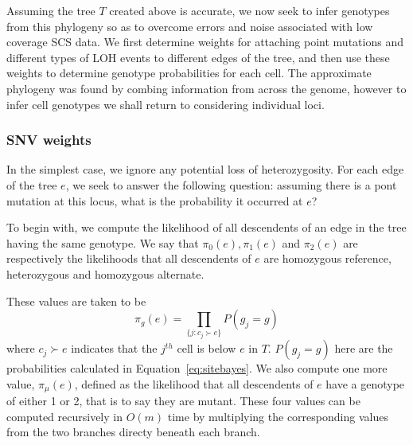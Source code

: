 \documentclass[../../main.tex]{subfiles}
\begin{document}

Assuming the tree $T$ created above is accurate, we now seek to infer genotypes from this phylogeny so as to overcome errors and noise associated with low coverage SCS data.
We first determine weights for attaching point mutations and different types of LOH events to different edges of the tree, and then use these weights to determine genotype probabilities for each cell.
The approximate phylogeny was found by combing information from across the genome, however to infer cell genotypes we shall return to considering individual loci.

\subsubsection*{SNV weights}
In the simplest case, we ignore any potential loss of heterozygosity.
For each edge of the tree $e$, we seek to answer the following question: assuming there is a pont mutation at this locus, what is the probability it occurred at $e$?

To begin with, we compute the likelihood of all descendents of an edge in the tree having the same genotype.
We say that $\pi_0(e), \pi_1(e)$ and $\pi_2(e)$ are respectively the likelihoods that all descendents of $e$ are homozygous reference, heterozygous and homozygous alternate.

These values are taken to be
\begin{equation}
\pi_g(e) = \prod_{\{j:c_j\succ e\}} P(g_j = g)
\end{equation}
where $c_j\succ e$ indicates that the $j^{th}$ cell is below $e$ in $T$.
$P(g_j = g)$ here are the probabilities calculated in Equation~\eqref{eq:sitebayes}.
We also compute one more value, $\pi_\mu(e)$, defined as the likelihood that all descendents of $e$ have a genotype of either 1 or 2, that is to say they are mutant.
These four values can be computed recursively in $O(m)$ time by multiplying the corresponding values from the two branches directy beneath each branch.
\end{document}
